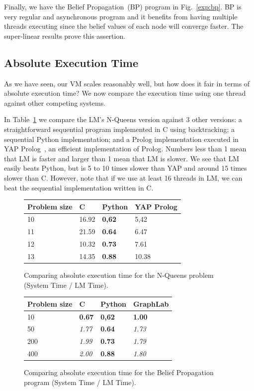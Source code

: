 Finally, we have the Belief Propagation~(BP) program in Fig.~\ref{exp:bp}. BP is very regular and asynchronous program and it benefits
from having multiple threads executing since the belief values of each node will converge faster. The super-linear results prove this
assertion.

\subsection{Absolute Execution Time}

As we have seen, our VM scales reasonably well, but how does it fair in terms of absolute execution time? We now compare the execution
time using one thread against other competing systems.

In Table~\ref{comp:nqueens} we compare the LM's N-Queens version against 3 other versions: a straightforward sequential program implemented
in C using backtracking; a sequential Python\cite{vanRossum:1995:PRM} implementation; and a Prolog implementation executed in
YAP Prolog~\cite{DBLP:journals/corr/abs-1102-3896}, an efficient implementation of Prolog. Numbers less than 1 mean that LM
is faster and larger than 1 mean that LM is slower. We see that LM easily beats Python, but is 5 to 10 times slower than YAP
and around 15 times slower than C.
However, note that if we use at least 16 threads in LM, we can beat the sequential implementation written in C.

\begin{figure}[h]
   \centering
    \begin{tabular}{ | l | l | l | l |}
    \hline
    
    Problem size & C & Python & YAP Prolog \\ \hline\hline
    10 & 16.92 & \textbf{0,62} & 5,42 \\
    11 & 21.59 & \textbf{0.64} & 6.47 \\
    12 & 10.32 & \textbf{0.73} & 7.61 \\
    13 & 14.35 & \textbf{0.88} & 10.38 \\
    \hline
    \end{tabular}
    \caption{Comparing absolute execution time for the N-Queens problem (System Time / LM Time).}
    \label{comp:nqueens}
\end{figure}

\begin{figure}[h]
   \centering
    \begin{tabular}{ | l | l | l | l |}
    \hline
    
    Problem size & C & Python & GraphLab \\ \hline\hline
    10 & \textbf{0.67} & \textbf{0,62} & \textbf{1.00} \\
    50 & \textit{1.77} & \textbf{0.64} & \textit{1.73} \\
    200 & \textit{1.99} & \textbf{0.73} & \textit{1.79} \\
    400 & \textit{2.00} & \textbf{0.88} & \textit{1.80} \\
    \hline
    \end{tabular}
    \caption{Comparing absolute execution time for the Belief Propagation program (System Time / LM Time).}
    \label{comp:bp}
\end{figure}